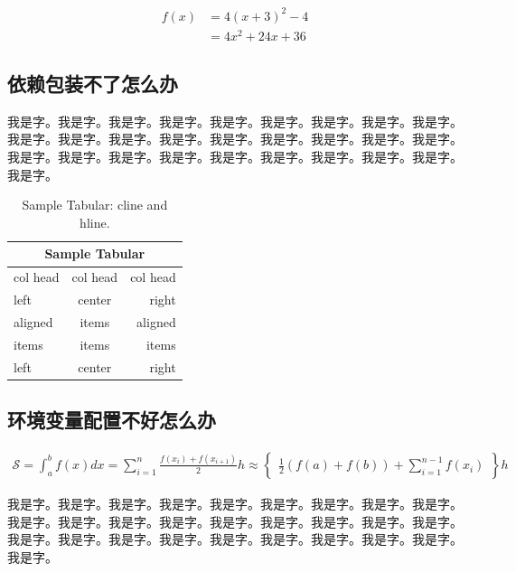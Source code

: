 \documentclass[supercite]{Experimental_Report}
\theoremstyle{definition}
\begin{document}
\begin{align}
	f(x) &=4(x+3)^2-4\\
	&=4x^2+24x+36
\end{align}

\subsection{依赖包装不了怎么办}


我是字。我是字。我是字。我是字。我是字。我是字。我是字。我是字。我是字。我是字。我是字。我是字。我是字。我是字。我是字。我是字。我是字。我是字。我是字。我是字。我是字。我是字。我是字。我是字。我是字。我是字。我是字。我是字。

\begin{table}
	\begin{center}
		\setlength{\tabcolsep}{5.0mm}
		\caption{Sample Tabular: cline and hline.}
		\begin{tabular}{|l|c|r|}
			\hline
			\multicolumn{3}{|c|}{Sample Tabular}\\
			\hline
			col head  &  col head  & col head\\
			\hline
			left      &  center    & right\\
			\cline{1-2}
			aligned   & items      & aligned\\
			\cline{2-3}
			items     & items      & items\\
			\cline{1-2}
			left      & center     & right\\
			\hline
		\end{tabular}\label{table_eval}
	\end{center}
\end{table}

\subsection{环境变量配置不好怎么办}

\begin{eqnarray}\label{equ_int}
	\mathcal{S}=\int_{a}^{b}f(x)dx=\sum_{i=1}^{n}\frac{f(x_i)+f(x_{i+1})}{2}h\approx\begin{Bmatrix}\frac{1}{2}(f(a)+f(b))+\sum_{i=1}^{n-1}f(x_i)\end{Bmatrix}h
\end{eqnarray}

我是字。我是字。我是字。我是字。我是字。我是字。我是字。我是字。我是字。我是字。我是字。我是字。我是字。我是字。我是字。我是字。我是字。我是字。我是字。我是字。我是字。我是字。我是字。我是字。我是字。我是字。我是字。我是字。
\end{document}
